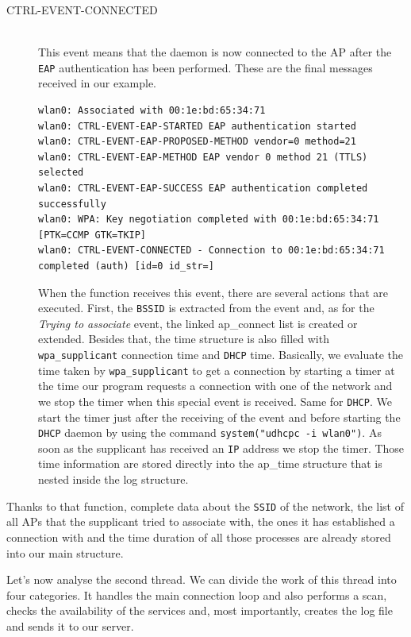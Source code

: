 \begin{description}
	\item[CTRL-EVENT-CONNECTED]\hfill \\
	This event means that the daemon is now connected to the AP after the \texttt{EAP} authentication has been performed. These are the final messages received in our example.\\

\begin{lstlisting}[frame=single,breaklines=true,caption={Example of a connection to the \texttt{student.UCLouvain} network}]
wlan0: Associated with 00:1e:bd:65:34:71
wlan0: CTRL-EVENT-EAP-STARTED EAP authentication started
wlan0: CTRL-EVENT-EAP-PROPOSED-METHOD vendor=0 method=21
wlan0: CTRL-EVENT-EAP-METHOD EAP vendor 0 method 21 (TTLS) selected
wlan0: CTRL-EVENT-EAP-SUCCESS EAP authentication completed successfully
wlan0: WPA: Key negotiation completed with 00:1e:bd:65:34:71 [PTK=CCMP GTK=TKIP]
wlan0: CTRL-EVENT-CONNECTED - Connection to 00:1e:bd:65:34:71 completed (auth) [id=0 id_str=]
\end{lstlisting}
When the function receives this event, there are several actions that are executed. First, the \texttt{BSSID} is extracted from the event and, as for the \textit{Trying to associate} event, the linked ap\_connect list is created or extended. Besides that, the time structure is also filled with \texttt{wpa\_supplicant} connection time and \texttt{DHCP} time. Basically, we evaluate the time taken by \texttt{wpa\_supplicant} to get a connection by starting a timer at the time our program requests a connection with one of the network and we stop the timer when this special event is received. Same for \texttt{DHCP}. We start the timer just after the receiving of the event and before starting the \texttt{DHCP} daemon by using the command \texttt{system("udhcpc -i wlan0")}. As soon as the supplicant has received an \texttt{IP} address we stop the timer. Those time information are stored directly into the ap\_time structure that is nested inside the log structure.
\end{description}

Thanks to that function, complete data about the \texttt{SSID} of the network, the list of all APs that the supplicant tried to associate with, the ones it has established a connection with and the time duration of all those processes are already stored into our main structure.


Let's now analyse the second thread. We can divide the work of this thread into four categories. It handles the main connection loop and also performs a scan, checks the availability of the services and, most importantly, creates the log file and sends it to our server. 

